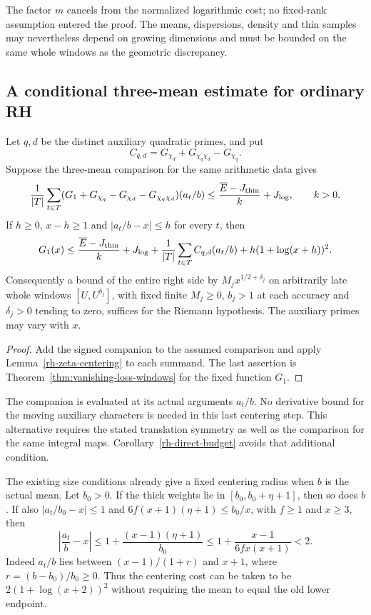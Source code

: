 The factor $m$ cancels from the normalized logarithmic cost; no fixed-rank
assumption entered the proof. The means, dispersions, density and thin
samples may nevertheless depend on growing dimensions and must be bounded
on the same whole windows as the geometric discrepancy.

\subsection{A conditional three-mean estimate for ordinary RH}

\begin{corollary}
\label{rh-signed-companion-budget}
Let $q,d$ be the distinct auxiliary quadratic primes, and put
\[
 C_{q,d}=G_{\chi_d}+G_{\chi_q\chi_d}-G_{\chi_q}.
\]
Suppose the three-mean comparison for the same arithmetic data gives
\[
 \frac1{|T|}\sum_{t\in T}
 (G_1+G_{\chi_q}-G_{\chi_d}-G_{\chi_q\chi_d})(a_t/b)
 \le\frac{\overline E-J_{\rm thin}}k+J_{\log},
 \qquad k>0.
\]
If $h\ge0$, $x-h\ge1$ and $|a_t/b-x|\le h$ for every $t$, then
\[
 G_1(x)\le
 \frac{\overline E-J_{\rm thin}}k+J_{\log}
 +\frac1{|T|}\sum_{t\in T}C_{q,d}(a_t/b)
 +h(1+\log(x+h))^2.
\]
Consequently a bound of the entire right side by
$M_jx^{1/2+\delta_j}$ on arbitrarily late whole windows
$[U,U^{b_j}]$, with fixed finite $M_j\ge0$, $b_j>1$ at each accuracy
and $\delta_j>0$ tending to zero, suffices for the Riemann hypothesis.
The auxiliary primes may vary with $x$.
\end{corollary}
\begin{proof}
Add the signed companion to the assumed comparison and apply
Lemma~\ref{rh-zeta-centering} to each summand.
The last assertion is Theorem~\ref{thm:vanishing-loss-windows}
for the fixed function $G_1$.
\end{proof}

The companion is evaluated at its actual arguments $a_t/b$.
No derivative bound for the moving auxiliary characters is needed
in this last centering step. This alternative requires the stated
translation symmetry as well as the comparison for the same integral
maps. Corollary~\ref{rh-direct-budget} avoids that additional condition.

The existing size conditions already give a fixed centering radius
when $b$ is the actual mean. Let $b_0>0$. If the thick weights lie in
$[b_0,b_0+\eta+1]$, then so does $b$. If also
$|a_t/b_0-x|\le1$ and $6f(x+1)(\eta+1)\le b_0/x$, with
$f\ge1$ and $x\ge3$, then
\[
 \left|\frac{a_t}{b}-x\right|
 \le1+\frac{(x-1)(\eta+1)}{b_0}
 \le1+\frac{x-1}{6fx(x+1)}<2.
\]
Indeed $a_t/b$ lies between $(x-1)/(1+r)$ and $x+1$, where
$r=(b-b_0)/b_0\ge0$. Thus the centering cost can be taken to be
$2(1+\log(x+2))^2$ without requiring the mean to equal the old
lower endpoint.

